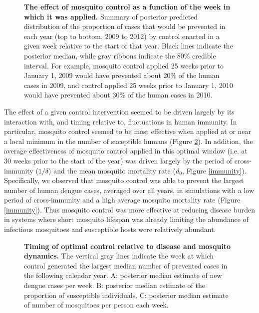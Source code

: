 \documentclass[10pt,letterpaper]{article}
\begin{document}
\begin{figure}[!h]
\caption{{\bf The effect of mosquito control as a function of the week in which it was applied.}
Summary of posterior predicted distribution of the proportion of cases that would be prevented in each year (top to bottom, 2009 to 2012) by control enacted in a given week relative to the start of that year. Black lines indicate the posterior median, while gray ribbons indicate the $80\%$ credible interval.
For example, mosquito control applied 25 weeks prior to January 1, 2009 would have prevented about 20\% of the human cases in 2009, and control applied 25 weeks prior to January 1, 2010 would have prevented about 30\% of the human cases in 2010.
}
\label{control}
\end{figure}

The effect of a given control intervention seemed to be driven largely by its interaction with, and timing relative to, fluctuations in human immunity.
In particular, mosquito control seemed to be most effective when applied at or near a local minimum in the number of suceptible humans (Figure \ref{timing}).
In addition, the average effectiveness of mosquito control applied in this optimal window (i.e. at 30 weeks prior to the start of the year) was driven largely by the period of cross-immunity ($1/\delta$) and the mean mosquito mortality rate ($d_0$, Figure \ref{immunity}).
Specifically, we observed that mosquito control was able to prevent the largest number of human dengue cases, averaged over all years, in simulations with a low period of cross-immunity and a high average mosquito mortality rate (Figure \ref{immunity}). 
Thus mosquito control was more effective at reducing disease burden in systems where short mosquito lifespan was already limiting the abundance of infectious mosquitoes and susceptible hosts were relatively abundant.

\begin{figure}[!h]
\caption{{\bf Timing of optimal control relative to disease and mosquito dynamics.}
The vertical gray lines indicate the week at which control generated the largest median number of prevented cases in the following calendar year. A: posterior median estimate of new dengue cases per week. B: posterior median estimate of the proportion of susceptible individuals. C: posterior median estimate of number of mosquitoes per person each week.
}
\label{timing}
\end{figure}
\end{document}
